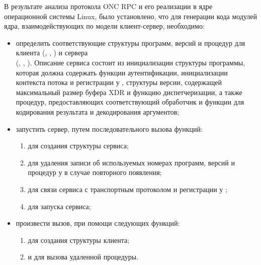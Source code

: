 В результате анализа протокола ONC RPC и его реализации в ядре операционной
системы Linux, было установлено, что для генерации кода модулей ядра,
взаимодействующих по модели клиент-сервер, необходимо:
\begin{itemize}
    \item определить соответствующие структуры программ, версий и процедур для клиента
          (, , ) и
          сервера\\ (, , ). Описание сервиса состоит из инициализации структуры
          программы, которая должна содержать функции аутентификации,
          инициализации контекста потока и регистрации у ,
          структуры версии, содержащей максимальный размер буфера XDR и функцию
          диспетчеризации, а также процедур, предоставляющих соответствующий
          обработчик и функции для кодирования результата и декодирования
          аргументов;
    \item запустить сервер, путем последовательного вызова функций:
    \begin{enumerate}
        \item {} для создания структуры сервиса;
        \item {} для удаления записи об используемых номерах программ, версий и процедур
              у  в случае повторного появления;
        \item {} для связи сервиса с транспортным протоколом
              и регистрации у ;
        \item {} для запуска сервиса;
    \end{enumerate}
    \item произвести вызов, при помощи следующих функций:
    \begin{enumerate}
        \item {} для создания структуры клиента;
        \item {} и  для вызова удаленной
              процедуры.
    \end{enumerate}
\end{itemize}


